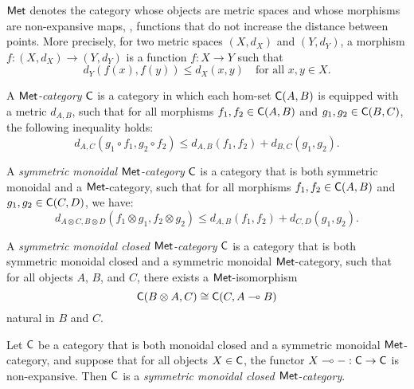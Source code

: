 \vspace{20pt}


\begin{definition}
    $\mathsf{Met}$ denotes the category whose objects are metric spaces and whose morphisms are non-expansive maps, \ie, functions that do not increase the distance between points. More precisely, for two metric spaces $(X, d_X)$ and $(Y, d_Y)$, a morphism $f: (X, d_X) \to (Y, d_Y)$ is a function $f: X \to Y$ such that
$$
d_Y(f(x), f(y)) \leq d_X(x, y) \quad \text{for all } x, y \in X.
$$
  \end{definition}

\begin{definition} \label{def:monoidal_closed_met_cat}
A \emph{$\mathsf{Met}$-category} $\mathsf{C}$ is a category in which each hom-set $\mathsf{C}(A, B)$ is equipped with a metric $d_{A,B}$, such that for all morphisms $f_1, f_2 \in \mathsf{C}(A, B)$ and $g_1, g_2 \in \mathsf{C}(B, C)$, the following inequality holds:
\[
  d_{A,C}(g_1 \circ f_1, g_2 \circ f_2) \leq d_{A,B}(f_1, f_2) + d_{B,C}(g_1, g_2).
\]

A \emph{symmetric monoidal $\mathsf{Met}$-category} $\mathsf{C}$ is a category that is both symmetric monoidal and a $\mathsf{Met}$-category, such that for all morphisms $f_1, f_2 \in \mathsf{C}(A, B)$ and $g_1, g_2 \in \mathsf{C}(C, D)$, we have:
\[
  d_{A \otimes C, B \otimes D}(f_1 \otimes g_1, f_2 \otimes g_2) \leq d_{A,B}(f_1, f_2) + d_{C,D}(g_1, g_2).
\]

A \emph{symmetric monoidal closed $\mathsf{Met}$-category} $\mathsf{C}$ is a category that is both symmetric monoidal closed and a symmetric monoidal $\mathsf{Met}$-category, such that for all objects $A$, $B$, and $C$, there exists a $\mathsf{Met}$-isomorphism
\[
  \mathsf{C}(B \otimes A, C ) \cong \mathsf{C}(C, A \multimap B)
\]
natural in $B$ and $C$.
\end{definition}


\begin{theorem}\cite[Theorem 4.2]{dahlqvist2023syntactic} 
Let $\mathsf{C}$ be a category that is both monoidal closed and a symmetric monoidal $\mathsf{Met}$- category, and suppose that for all objects $X \in \mathsf{C}$, the functor $X \multimap - : \mathsf{C} \to \mathsf{C}$ is non-expansive. Then $\mathsf{C}$ is a \emph{symmetric monoidal closed $\mathsf{Met}$-category}.
\end{theorem}


